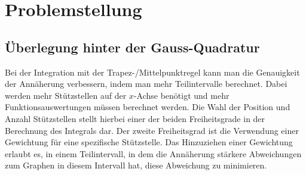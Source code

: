 %
%
%
\section{Problemstellung
\label{quadratur:section:problemstellung}}
\subsection{Überlegung hinter der Gauss-Quadratur \label{quadratur:subsection:ueberlegung}}

Bei der Integration mit der Trapez-/Mittelpunktregel kann man die Genauigkeit
der Annäherung verbessern, indem man mehr Teilintervalle berechnet.
Dabei werden mehr Stützstellen auf der $x$-Achse benötigt und mehr Funktionsauswertungen
müssen berechnet werden. 
Die Wahl der Position und Anzahl Stützstellen stellt hierbei einer der beiden Freiheitsgrade
in der Berechnung des Integrals dar.
Der zweite Freiheitsgrad ist die Verwendung einer Gewichtung für eine spezifische Stützstelle.
Das Hinzuziehen einer Gewichtung erlaubt es, in einem Teilintervall, 
in dem die Annäherung stärkere Abweichungen zum Graphen in diesem Intervall hat, 
diese Abweichung zu minimieren. 


